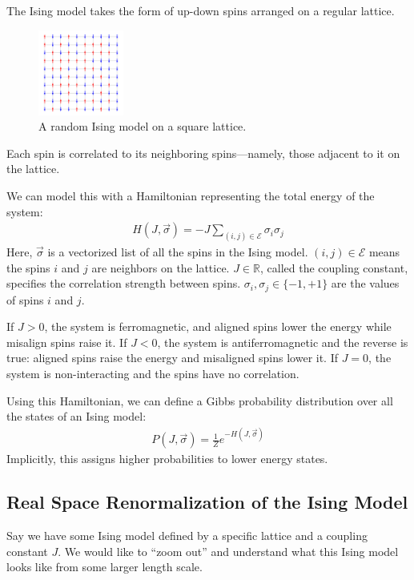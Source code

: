 \documentclass[%
    reprint,
    amsmath,amssymb,
    aps,
]{revtex4-2}
\begin{document}
The Ising model takes the form of up-down spins arranged on a regular lattice. 
\begin{figure}[h]
    \includegraphics[width=0.25\textwidth]{tex/images/ising-spins-grid.png}
    \caption{\label{fig:ising}
        A random Ising model on a square lattice. 
    }
\end{figure}
Each spin is correlated to its neighboring spins—namely, those adjacent to it on the lattice. 

We can model this with a Hamiltonian representing the total energy of the system:
\begin{eqnarray}
    \label{eqn:ising-hamiltonian}
    H(J, \vec{\sigma}) = -J \sum_{(i, j) \in \mathcal{E}} \sigma_i \sigma_j
\end{eqnarray}
Here, $\vec{\sigma}$ is a vectorized list of all the spins in the Ising model. 
$(i, j) \in \mathcal{E}$ means the spins $i$ and $j$ are neighbors on the lattice. 
$J \in \mathbb{R}$, called the coupling constant, specifies the correlation strength between spins. 
$\sigma_i, \sigma_j \in \{-1, +1\}$ are the values of spins $i$ and $j$. 

If $J > 0$, the system is ferromagnetic, and aligned spins lower the energy while misalign spins raise it. 
If $J < 0$, the system is antiferromagnetic and the reverse is true: aligned spins raise the energy and misaligned spins lower it. 
If $J = 0$, the system is non-interacting and the spins have no correlation. 

Using this Hamiltonian, we can define a Gibbs probability distribution over all the states of an Ising model:
\begin{eqnarray}
    \label{eqn:ising-gibbs}
    P(J, \vec{\sigma}) = \frac{1}{Z} e^{-H(J, \vec{\sigma})}
\end{eqnarray}
Implicitly, this assigns higher probabilities to lower energy states. 

\subsection{Real Space Renormalization of the Ising Model}

Say we have some Ising model defined by a specific lattice and a coupling constant $J$. 
We would like to ``zoom out'' and understand what this Ising model looks like from some larger length scale. 
\end{document}
